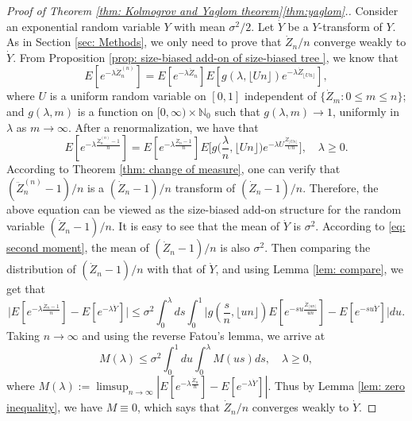 \documentclass[ECP]{ejpecp} %
\begin{document}
\begin{proof}[Proof of Theorem \ref{thm: Kolmogrov and Yaglom theorem}\eqref{thm:yaglom}.]
	Consider an exponential random variable $Y$ with mean $\sigma^2/2$.
	Let $\dot Y$ be a $Y$-transform of $Y$.
	As in Section \ref{sec: Methods},
	we only need to prove that
	$\dot Z_n/n$ converge weakly to $\dot Y$.
	From Proposition \ref{prop: size-biased add-on of size-biased tree }, we know that
	\[
	E [ e^{- \lambda \ddot Z_n^{(n)}} ]
	= E [e^{-\lambda \dot Z_n}] E[g(\lambda, \lfloor Un \rfloor )e^{-\lambda \dot Z_{ \lfloor Un \rfloor}}],
	\]
	where $U$ is a uniform  random variable on $[0,1]$ independent of $\{\dot Z_m: 0\le m\le n\}$;
	and $g(\lambda, m)$ is a function on $[0,\infty) \times \mathbb N_0$ such that
	$g(\lambda, m) \to 1$, uniformly in $\lambda$ as $m\to \infty$.
	After a renormalization, we have that
	\begin{equation}\label{eq: renormalized size-biased add-on equation}
	E [ e^{- \lambda \frac{\ddot Z_n^{(n)}-1}{n}} ]
	= E [e^{-\lambda \frac{\dot Z_n - 1}{n}}] E\big[g\big(\frac{\lambda}{n}, \lfloor Un \rfloor \big)e^{-\lambda U \frac{\dot Z_{\lfloor Un \rfloor}}{Un} }\big],
	\quad \lambda \geq 0.
	\end{equation}
	According to Theorem \ref{thm: change of measure}, one can verify that
	$(\ddot Z_n^{(n)} - 1)/n$ is a $(\dot Z_n - 1)/n$ transform of $(\dot Z_n - 1)/n$.
	Therefore, the above equation can be viewed as the size-biased add-on structure for the random variable $(\dot Z_n - 1)/n$.
	It is easy to see that the mean of $\dot Y$ is $\sigma^2$.
	According to \eqref{eq: second moment}, the mean of $(\dot Z_n - 1)/n$ is also $\sigma^2$.
	Then comparing the distribution of $(\dot Z_n - 1)/n$ with that of $\dot Y$, and  using Lemma \ref{lem: compare}, we get that
	\[
	\big| E[e^{-\lambda \frac{\dot Z_n - 1}{n}}] - E[e^{-\lambda \dot Y}]\big|
	\leq \sigma^2 \int_0^\lambda ds \int_0^1 \big| g(\frac{s}{n}, \lfloor un \rfloor ) E[e^{-su \frac { \dot Z_{ \lfloor un \rfloor } } {un} }] - E[e^{- su \dot Y}]\big| du.
	\]
	Taking $n\to \infty$ and using the reverse Fatou's lemma, we arrive at
	\[
	M(\lambda)
	\leq \sigma^2 \int_0^1du \int_0^\lambda M(us)ds,
	\quad \lambda\geq 0,
	\]
	where
	$M(\lambda) := \limsup_{n\to \infty} | E[ e^{- \lambda \frac{\dot Z_n }{n}}] - E[e^{-\lambda \dot Y}]|$.
	Thus by Lemma \ref{lem: zero inequality}, we have $M \equiv 0$, which says that $\dot Z_n/n$ converges weakly to $\dot Y$.
\end{proof}
\end{document}

